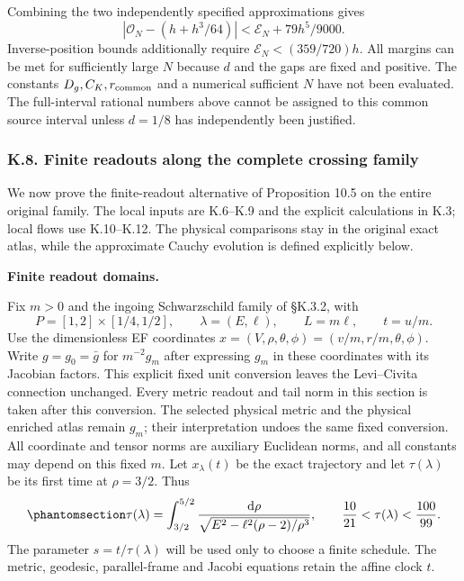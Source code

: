 \documentclass[
  english,
  11pt,
  reqno]{amsart}
\begin{document}
Combining the two independently specified approximations gives \[
 |\mathcal O_N-(h+h^3/64)|<\mathcal E_N+79h^5/9000.
\] Inverse-position bounds additionally require
\(\mathcal E_N< (359/720)h\). All margins can be met for sufficiently
large \(N\) because \(d\) and the gaps are fixed and positive. The
constants \(D_g,C_K,r_{\rm common}\) and a numerical sufficient \(N\)
have not been evaluated. The full-interval rational numbers above cannot
be assigned to this common source interval unless \(d=1/8\) has
independently been justified.

\protect{}\label{sec:sh-finite-readout-concatenation}

\subsubsection{K.8. Finite readouts along the complete crossing
family}\label{k.8.-finite-readouts-along-the-complete-crossing-family}

We now prove the finite-readout alternative of Proposition 10.5 on the
entire original family. The local inputs are K.6--K.9 and the explicit
calculations in K.3; local flows use K.10--K.12. The physical
comparisons stay in the original exact atlas, while the approximate
Cauchy evolution is defined explicitly below.

\protect{}\label{sec:fro-a-domains-readouts}

\textbf{Finite readout domains.}

Fix \(m>0\) and the ingoing Schwarzschild family of §K.3.2, with \[
 P=[1,2]\times[1/4,1/2],\qquad
 \lambda=(E,\ell),\qquad L=m\ell,\qquad t=u/m.
\] Use the dimensionless EF coordinates
\(x=(V,\rho,\theta,\phi)=(v/m,r/m,\theta,\phi)\). Write \(g=g_0=\bar g\)
for \(m^{-2}g_m\) after expressing \(g_m\) in these coordinates with its
Jacobian factors. This explicit fixed unit conversion leaves the
Levi--Civita connection unchanged. Every metric readout and tail norm in
this section is taken after this conversion. The selected physical
metric and the physical enriched atlas remain \(g_m\); their
interpretation undoes the same fixed conversion. All coordinate and
tensor norms are auxiliary Euclidean norms, and all constants may depend
on this fixed \(m\). Let \(x_\lambda(t)\) be the exact trajectory and
let \(\tau(\lambda)\) be its first time at \(\rho=3/2\). Thus
\begin{equation}\protect\phantomsection\label{eq:fro-a-duration}{
 \tau(\lambda)=\int_{3/2}^{5/2}
   \frac{\mathrm d\rho}
    {\sqrt{E^2-\ell^2(\rho-2)/\rho^3}},
 \qquad
 \frac{10}{21}<\tau(\lambda)<\frac{100}{99}.
}\end{equation} The parameter \(s=t/\tau(\lambda)\) will be used only to
choose a finite schedule. The metric, geodesic, parallel-frame and
Jacobi equations retain the affine clock \(t\).
\end{document}
